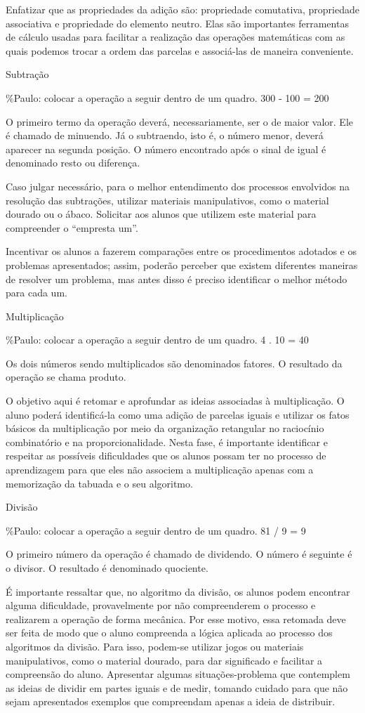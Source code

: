 Enfatizar que as propriedades da adição são: propriedade comutativa,
propriedade associativa e propriedade do elemento neutro. Elas são
importantes ferramentas de cálculo usadas para facilitar a realização
das operações matemáticas com as quais podemos trocar a ordem das
parcelas e associá-las de maneira conveniente.

Subtração

\%Paulo: colocar a operação a seguir dentro de um quadro. 300 - 100 =
200

O primeiro termo da operação deverá, necessariamente, ser o de maior
valor. Ele é chamado de minuendo. Já o subtraendo, isto é, o número
menor, deverá aparecer na segunda posição. O número encontrado após o
sinal de igual é denominado resto ou diferença.

Caso julgar necessário, para o melhor entendimento dos processos
envolvidos na resolução das subtrações, utilizar materiais
manipulativos, como o material dourado ou o ábaco. Solicitar aos alunos
que utilizem este material para compreender o ``empresta um''.

Incentivar os alunos a fazerem comparações entre os procedimentos
adotados e os problemas apresentados; assim, poderão perceber que
existem diferentes maneiras de resolver um problema, mas antes disso é
preciso identificar o melhor método para cada um.

Multiplicação

\%Paulo: colocar a operação a seguir dentro de um quadro. 4 . 10 = 40

Os dois números sendo multiplicados são denominados fatores. O resultado
da operação se chama produto.

O objetivo aqui é retomar e aprofundar as ideias associadas à
multiplicação. O aluno poderá identificá-la como uma adição de parcelas
iguais e utilizar os fatos básicos da multiplicação por meio da
organização retangular no raciocínio combinatório e na
proporcionalidade. Nesta fase, é importante identificar e respeitar as
possíveis dificuldades que os alunos possam ter no processo de
aprendizagem para que eles não associem a multiplicação apenas com a
memorização da tabuada e o seu algoritmo.

Divisão

\%Paulo: colocar a operação a seguir dentro de um quadro. 81 / 9 = 9

O primeiro número da operação é chamado de dividendo. O número é
seguinte é o divisor. O resultado é denominado quociente.

É importante ressaltar que, no algoritmo da divisão, os alunos podem
encontrar alguma dificuldade, provavelmente por não compreenderem o
processo e realizarem a operação de forma mecânica. Por esse motivo,
essa retomada deve ser feita de modo que o aluno compreenda a lógica
aplicada ao processo dos algoritmos da divisão. Para isso, podem-se
utilizar jogos ou materiais manipulativos, como o material dourado, para
dar significado e facilitar a compreensão do aluno. Apresentar algumas
situações-problema que contemplem as ideias de dividir em partes iguais
e de medir, tomando cuidado para que não sejam apresentados exemplos que
compreendam apenas a ideia de distribuir.

